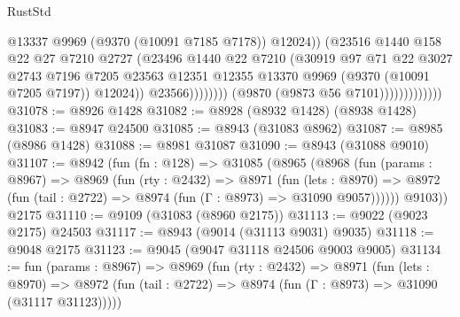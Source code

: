 \begin{lexlean}{RustStd}
\begin{coremodule}
{\begin{coremodule}
{{{{{{{{{{{{{{{{{{{{{{{{{{{{{{{{{{{{{{{                                            @13337
                                            @9969
                                            (@9370 (@10091 @7185 @7178))
                                            @12024))
                                        (@23516
                                          @1440
                                          @158
                                          @22
                                          @27
                                          @7210
                                          @2727
                                          (@23496
                                            @1440
                                            @22
                                            @7210
                                            (@30919
                                              @97
                                              @71
                                              @22
                                              @3027
                                              @2743
                                              @7196
                                              @7205
                                              @23563
                                              @12351
                                              @12355
                                              @13370
                                              @9969
                                              (@9370 (@10091 @7205 @7197))
                                              @12024))
                                          @23566))))))))
                          (@9870 (@9873 @56 @7101)))))))))))))
@31078 := @8926 @1428
@31082 := @8928 (@8932 @1428) (@8938 @1428)
@31083 := @8947 @24500
@31085 := @8943 (@31083 @8962)
@31087 := @8985 (@8986 @1428)
@31088 := @8981 @31087
@31090 := @8943 (@31088 @9010)
@31107 := @8942
    (fun (fn : @128) =>
    @31085
      (@8965
        (@8968
          (fun (params : @8967) =>
          @8969
            (fun (rty : @2432) =>
            @8971
              (fun (lets : @8970) =>
              @8972 (fun (tail : @2722) => @8974 (fun (Γ : @8973) => @31090 @9057))))))
        @9103))
    @2175
@31110 := @9109 (@31083 (@8960 @2175))
@31113 := @9022 (@9023 @2175) @24503
@31117 := @8943 (@9014 (@31113 @9031) @9035)
@31118 := @9048 @2175
@31123 := @9045 (@9047 @31118 @24506 @9003 @9005)
@31134 := fun (params : @8967) =>
  @8969
    (fun (rty : @2432) =>
    @8971
      (fun (lets : @8970) =>
      @8972 (fun (tail : @2722) => @8974 (fun (Γ : @8973) => @31090 (@31117 @31123)))))
}}}}}}}}}}}}}}}}}}}}}}}}}}}}}}}}}}}}}}}
\end{coremodule}}
\end{coremodule}
\end{lexlean}
